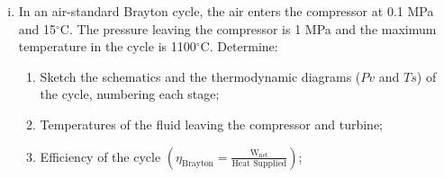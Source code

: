 \documentclass[calculator,steamtables,refrigeranttables,psychrometricchart,datasheet,solutions]{exam}
\newcommand{\frc}{\displaystyle\frac}
\begin{document}
\begin{question}
\begin{enumerate}[(i)]
\item In an air-standard Brayton cycle, the air enters the compressor at 0.1 MPa and 15$^{\circ}$C. The pressure leaving the compressor is 1 MPa and the maximum temperature in the cycle is 1100$^{\circ}$C. Determine:
\begin{enumerate}
\item Sketch the schematics and the thermodynamic diagrams ($Pv$ and $Ts$) of the cycle, numbering each stage;~
%
\item Temperatures of the fluid leaving the compressor and turbine;~
%
\item Efficiency of the cycle $\left(\eta_{\text{Brayton}}=\frc{\text{W}_{\text{net}}}{\text{Heat Supplied}}\right)$;~

\end{enumerate}
\end{enumerate}
\end{question}
\end{document}
